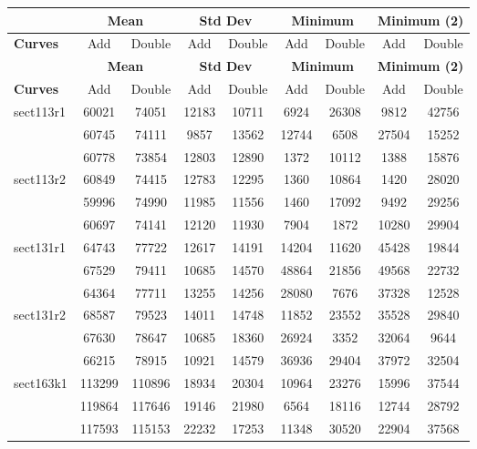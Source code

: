 \documentclass[a4paper]{article}
\begin{document}
\begin{center}
	\begin{longtable}{ |l|c|c|c|c|c|c|c|c| }
	\hline 
	& \multicolumn{2}{|c|}{\textbf{Mean}} & \multicolumn{2}{|c|}{\textbf{Std Dev}} & \multicolumn{2}{|c|}{\textbf{Minimum}} & \multicolumn{2}{|c|}{\textbf{Minimum (2)}} \\ \hline
	\textbf{Curves} & Add & Double & Add & Double & Add & Double & Add & Double \\ \hline \endfirsthead \hline
	
	& \multicolumn{2}{|c|}{\textbf{Mean}} & \multicolumn{2}{|c|}{\textbf{Std Dev}} & \multicolumn{2}{|c|}{\textbf{Minimum}} & \multicolumn{2}{|c|}{\textbf{Minimum (2)}} \\ \hline
	\textbf{Curves} & Add & Double & Add & Double & Add & Double & Add & Double \\ \hline \endhead \hline
	
	\endfoot \hline
	\endlastfoot

sect113r1 & 60021 & 74051 & 12183 & 10711 & 6924 & 26308 & 9812 & 42756 \\ 
& 60745 & 74111 & 9857 & 13562 & 12744 & 6508 & 27504 & 15252 \\
& 60778 & 73854 & 12803 & 12890 & 1372 & 10112 & 1388 & 15876 \\ \hline

sect113r2 & 60849 & 74415 & 12783 & 12295 & 1360 & 10864 & 1420 & 28020 \\ 
& 59996 & 74990 & 11985 & 11556 & 1460 & 17092 & 9492 & 29256 \\
& 60697 & 74141 & 12120 & 11930 & 7904 & 1872 & 10280 & 29904 \\ \hline

sect131r1 & 64743 & 77722 & 12617 & 14191 & 14204 & 11620 & 45428 & 19844 \\ 
& 67529 & 79411 & 10685 & 14570 & 48864 & 21856 & 49568 & 22732 \\
& 64364 & 77711 & 13255 & 14256 & 28080 & 7676 & 37328 & 12528 \\ \hline

sect131r2 & 68587 & 79523 & 14011 & 14748 & 11852 & 23552 & 35528 & 29840 \\ 
& 67630 & 78647 & 10685 & 18360 & 26924 & 3352 & 32064 & 9644 \\ 
& 66215 & 78915 & 10921 & 14579 & 36936 & 29404 & 37972 & 32504 \\ \hline

sect163k1 & 113299 & 110896 & 18934 & 20304 & 10964 & 23276 & 15996 & 37544 \\ 
& 119864 & 117646 & 19146 & 21980 & 6564 & 18116 & 12744 & 28792 \\ 
& 117593 & 115153 & 22232 & 17253 & 11348 & 30520 & 22904 & 37568 \\ \hline


\end{longtable}
\end{center}
\end{document}
